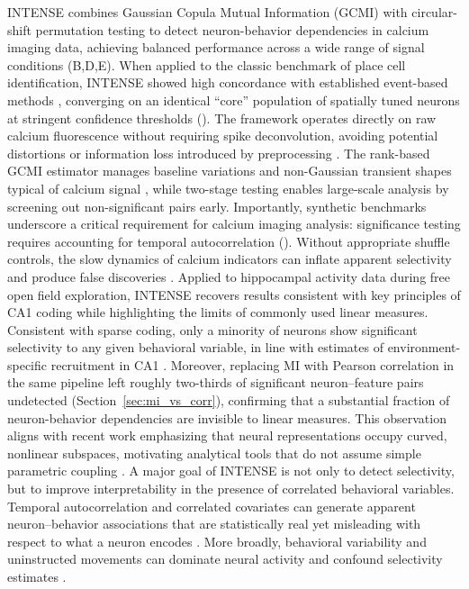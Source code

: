 INTENSE combines Gaussian Copula Mutual Information (GCMI) with circular-shift permutation testing to detect neuron-behavior dependencies in calcium imaging data, achieving balanced performance across a wide range of signal conditions (B,D,E). When applied to the classic benchmark of place cell identification, INTENSE showed high concordance with established event-based methods \cite{skaggs1993information}, converging on an identical ``core'' population of spatially tuned neurons at stringent confidence thresholds (). The framework operates directly on raw calcium fluorescence without requiring spike deconvolution, avoiding potential distortions or information loss introduced by preprocessing \cite{Rupprecht2021}. The rank-based GCMI estimator manages baseline variations and non-Gaussian transient shapes typical of calcium signal \cite{gcmi}, while two-stage testing enables large-scale analysis by screening out non-significant pairs early. Importantly, synthetic benchmarks underscore a critical requirement for calcium imaging analysis: significance testing requires accounting for temporal autocorrelation (). Without appropriate shuffle controls, the slow dynamics of calcium indicators can inflate apparent selectivity and produce false discoveries \cite{Wei2020}.
Applied to hippocampal activity data during free open field exploration, INTENSE recovers results consistent with key principles of CA1 coding while highlighting the limits of commonly used linear measures. Consistent with sparse coding, only a minority of neurons show significant selectivity to any given behavioral variable, in line with estimates of environment-specific recruitment in CA1 \cite{Wilson1993, Epsztein2011}. Moreover, replacing MI with Pearson correlation in the same pipeline left roughly two-thirds of significant neuron--feature pairs undetected (Section~\ref{sec:mi_vs_corr}), confirming that a substantial fraction of neuron-behavior dependencies are invisible to linear measures. This observation aligns with recent work emphasizing that neural representations occupy curved, nonlinear subspaces, motivating analytical tools that do not assume simple parametric coupling \cite{Altan2021, De2023, intdim}.
A major goal of INTENSE is not only to detect selectivity, but to improve interpretability in the presence of correlated behavioral variables. Temporal autocorrelation and correlated covariates can generate apparent neuron--behavior associations that are statistically real yet misleading with respect to what a neuron encodes \cite{Harris2021nonsense}. More broadly, behavioral variability and uninstructed movements can dominate neural activity and confound selectivity estimates \cite{Stringer2019, Musall2019}. 
